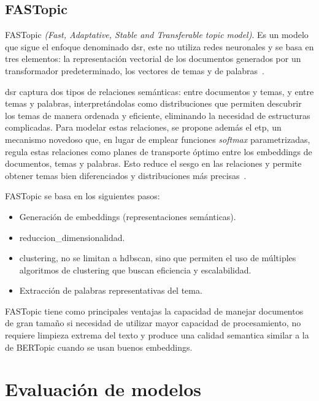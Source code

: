 \subsection{FASTopic}\label{sec:fastopic}

FASTopic \textit{(Fast, Adaptative, Stable and Transferable topic model)}. Es
un modelo que sigue el enfoque denominado \acrfull{dsr}, este no utiliza redes
neuronales y se basa en tres elementos: la representación vectorial de los
documentos generados por un transformador predeterminado, los vectores de temas
y de palabras~\cite{2024arXiv240517978W}.

\acrshort{dsr} captura dos tipos de relaciones semánticas: entre documentos y temas, y
entre temas y palabras, interpretándolas como distribuciones que permiten
descubrir los temas de manera ordenada y eficiente, eliminando la necesidad de
estructuras complicadas. Para modelar estas relaciones, se propone además el
\acrfull{etp}, un mecanismo novedoso que, en lugar de
emplear funciones \textit{softmax} parametrizadas, regula estas relaciones como
planes de transporte óptimo entre los \gls{embeddings} de documentos, temas
y palabras. Esto reduce el sesgo en las relaciones y permite obtener temas bien
diferenciados y distribuciones más precisas~\cite{2024arXiv240517978W}.

FASTopic se basa en los siguientes pasos:

\begin{itemize}
	\item Generación de \gls{embeddings} (representaciones semánticas).
	\item \gls{reduccion_dimensionalidad}.
	\item \gls{clustering}, no se limitan a \acrshort{hdbscan}, sino que permiten el uso de múltiples algoritmos de \gls{clustering} que buscan eficiencia y escalabilidad.
	\item Extracción de palabras representativas del tema.
\end{itemize}

FASTopic tiene como principales ventajas la capacidad de manejar documentos de
gran tamaño si necesidad de utilizar mayor capacidad de procesamiento, no
requiere limpieza extrema del texto y produce una calidad semantica similar a
la de BERTopic cuando se usan buenos \gls{embeddings}.

\section{Evaluación de modelos}

